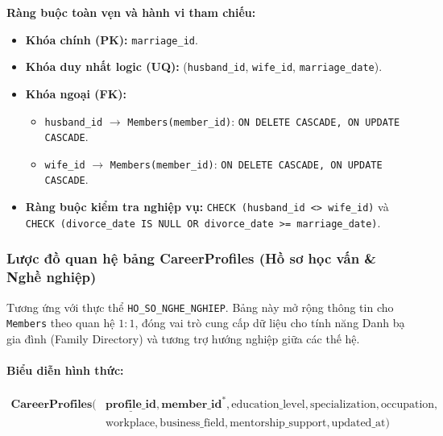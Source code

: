 \noindent\textbf{Ràng buộc toàn vẹn và hành vi tham chiếu:}
\begin{itemize}[noitemsep,topsep=2pt]
    \item \textbf{Khóa chính (PK):} \texttt{marriage\_id}.
    \item \textbf{Khóa duy nhất logic (UQ):} (\texttt{husband\_id}, \texttt{wife\_id}, \texttt{marriage\_date}).
    \item \textbf{Khóa ngoại (FK):}
    \begin{itemize}[noitemsep]
        \item \texttt{husband\_id} $\rightarrow$ \texttt{Members(member\_id)}: \texttt{ON DELETE CASCADE, ON UPDATE CASCADE}.
        \item \texttt{wife\_id} $\rightarrow$ \texttt{Members(member\_id)}: \texttt{ON DELETE CASCADE, ON UPDATE CASCADE}.
    \end{itemize}
    \item \textbf{Ràng buộc kiểm tra nghiệp vụ:} \texttt{CHECK (husband\_id <> wife\_id)} và \texttt{CHECK (divorce\_date IS NULL OR divorce\_date >= marriage\_date)}.
\end{itemize}

\subsubsection{Lược đồ quan hệ bảng CareerProfiles (Hồ sơ học vấn \& Nghề nghiệp)}
Tương ứng với thực thể \texttt{HO\_SO\_NGHE\_NGHIEP}. Bảng này mở rộng thông tin cho \texttt{Members} theo quan hệ $1:1$, đóng vai trò cung cấp dữ liệu cho tính năng Danh bạ gia đình (Family Directory) và tương trợ hướng nghiệp giữa các thế hệ.

\paragraph{Biểu diễn hình thức:}
\[
\begin{aligned}
\textbf{CareerProfiles}\big(
&\underline{\textbf{profile\_id}}, \textbf{member\_id}^*, \text{education\_level}, \text{specialization}, \text{occupation}, \\
&\text{workplace}, \text{business\_field}, \text{mentorship\_support}, \text{updated\_at}
\big)
\end{aligned}
\]

